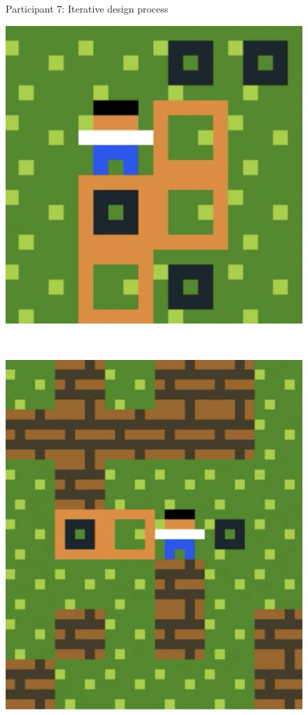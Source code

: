 \begin{figure}[!htbp]
\caption{Participant 7: Iterative design process}
\end{figure}

\begin{figure}[!htbp]
\centering
\begin{minipage}[t]{0.2\textwidth}
\includegraphics[width=\textwidth]{figures/finaldesign1_1.png} \hfill \\
\end{minipage}
$\:$
\begin{minipage}[t]{0.2\textwidth}
\includegraphics[width=\textwidth]{figures/finaldesign1_2.png} \hfill \\

\end{minipage}
\end{figure}
